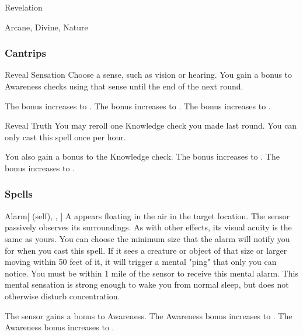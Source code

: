 \newpage
\begin{spellsection}{Revelation}

\begin{spellheader}
\end{spellheader}


 Arcane, Divine, Nature

\subsubsection{Cantrips}


\begin{freeability}{Reveal Sensation}
Choose a sense, such as vision or hearing.
You gain a  bonus to Awareness checks using that sense until the end of the next round.

\rankline
{} The bonus increases to .
 The bonus increases to .
 The bonus increases to .
\end{freeability}


\begin{freeability}{Reveal Truth}
You may reroll one Knowledge check you made last round.
You can only cast this spell once per hour.

\rankline
{} You also gain a  bonus to the Knowledge check.
 The bonus increases to .
 The bonus increases to .
\end{freeability}

\end{spellsection}


\subsubsection{Spells}


\lowercase{\hypertarget{spell:Alarm}{}}\label{spell:Alarm}
\begin{attuneability}[Rank 1]{\hypertarget{spell:Alarm}{Alarm}}[ (self), , ]
A  appears floating in the air in the target location.
The sensor passively observes its surroundings.
As with other  effects, its visual acuity is the same as yours.
You can choose the minimum size that the alarm will notify you for when you cast this spell.
If it sees a creature or object of that size or larger moving within 50 feet of it, it will trigger a mental "ping" that only you can notice.
You must be within 1 mile of the sensor to receive this mental alarm.
This mental sensation is strong enough to wake you from normal sleep, but does not otherwise disturb concentration.

\rankline
{} The sensor gains a  bonus to Awareness.
 The Awareness bonus increases to .
 The Awareness bonus increases to .
\end{attuneability}
\vspace{0.25em}



